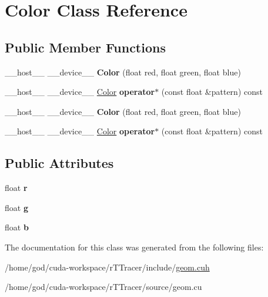 \hypertarget{class_color}{}\section{Color Class Reference}
\label{class_color}
\subsection*{Public Member Functions}
\begin{DoxyCompactItemize}
\item 
\+\_\+\+\_\+host\+\_\+\+\_\+ \+\_\+\+\_\+device\+\_\+\+\_\+ {\bfseries Color} (float red, float green, float blue)\hypertarget{class_color_a6a7cb8dac1635db291832221f50e6342}{}\label{class_color_a6a7cb8dac1635db291832221f50e6342}

\item 
\+\_\+\+\_\+host\+\_\+\+\_\+ \+\_\+\+\_\+device\+\_\+\+\_\+ \hyperlink{class_color}{Color} {\bfseries operator$\ast$} (const float \&pattern) const\hypertarget{class_color_a81ac566b8402177923ba530c7eefd8da}{}\label{class_color_a81ac566b8402177923ba530c7eefd8da}

\item 
\+\_\+\+\_\+host\+\_\+\+\_\+ \+\_\+\+\_\+device\+\_\+\+\_\+ {\bfseries Color} (float red, float green, float blue)\hypertarget{class_color_a6a7cb8dac1635db291832221f50e6342}{}\label{class_color_a6a7cb8dac1635db291832221f50e6342}

\item 
\+\_\+\+\_\+host\+\_\+\+\_\+ \+\_\+\+\_\+device\+\_\+\+\_\+ \hyperlink{class_color}{Color} {\bfseries operator$\ast$} (const float \&pattern) const\hypertarget{class_color_abf6ebdc643b14158106aa7ec3da0f87b}{}\label{class_color_abf6ebdc643b14158106aa7ec3da0f87b}

\end{DoxyCompactItemize}
\subsection*{Public Attributes}
\begin{DoxyCompactItemize}
\item 
float {\bfseries r}\hypertarget{class_color_a3958a556b47d2de3dd45c75aac833c20}{}\label{class_color_a3958a556b47d2de3dd45c75aac833c20}

\item 
float {\bfseries g}\hypertarget{class_color_a5defbb21620e480e556181772d665f34}{}\label{class_color_a5defbb21620e480e556181772d665f34}

\item 
float {\bfseries b}\hypertarget{class_color_a33e482be18d6ea31d2b403bee13683b7}{}\label{class_color_a33e482be18d6ea31d2b403bee13683b7}

\end{DoxyCompactItemize}


The documentation for this class was generated from the following files\+:\begin{DoxyCompactItemize}
\item 
/home/god/cuda-\/workspace/r\+T\+Tracer/include/\hyperlink{r_t_tracer_2include_2geom_8cuh}{geom.\+cuh}\item 
/home/god/cuda-\/workspace/r\+T\+Tracer/source/geom.\+cu\end{DoxyCompactItemize}
